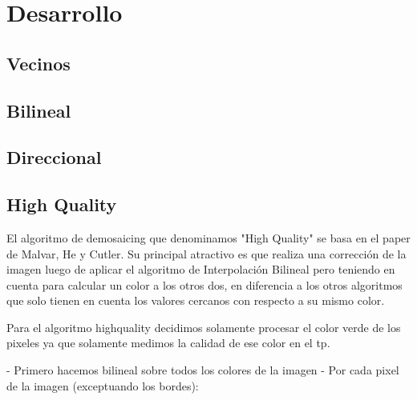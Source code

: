 \section{Desarrollo}

\subsection{Vecinos}

\subsection{Bilineal}

\subsection{Direccional}

\subsection{High Quality}

El algoritmo de demosaicing que denominamos "High Quality" se basa en el paper de Malvar, He y Cutler. Su principal atractivo es que realiza una corrección de la imagen luego de aplicar el algoritmo de Interpolación Bilineal pero teniendo en cuenta para calcular un color a los otros dos, en diferencia a los otros algoritmos que solo tienen en cuenta los valores cercanos con respecto a su mismo color.


Para el algoritmo highquality decidimos solamente procesar el color verde de los pixeles ya que solamente medimos la calidad de ese color en el tp.

- Primero hacemos bilineal sobre todos los colores de la imagen
- Por cada pixel de la imagen (exceptuando los bordes):
		
	


